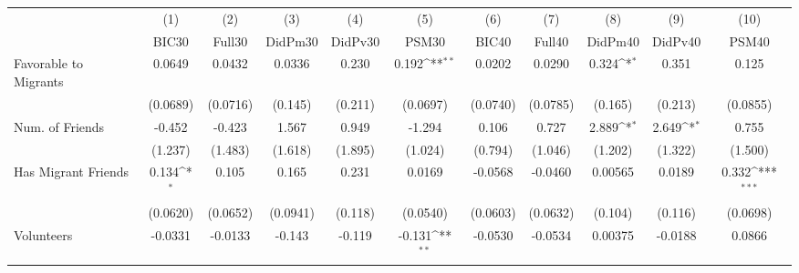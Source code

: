 {
\def\sym#1{\ifmmode^{#1}\else\(^{#1}\)\fi}
\begin{tabular}{l*{10}{c}}
\toprule
            &\multicolumn{1}{c}{(1)}&\multicolumn{1}{c}{(2)}&\multicolumn{1}{c}{(3)}&\multicolumn{1}{c}{(4)}&\multicolumn{1}{c}{(5)}&\multicolumn{1}{c}{(6)}&\multicolumn{1}{c}{(7)}&\multicolumn{1}{c}{(8)}&\multicolumn{1}{c}{(9)}&\multicolumn{1}{c}{(10)}\\
            &\multicolumn{1}{c}{BIC30}&\multicolumn{1}{c}{Full30}&\multicolumn{1}{c}{DidPm30}&\multicolumn{1}{c}{DidPv30}&\multicolumn{1}{c}{PSM30}&\multicolumn{1}{c}{BIC40}&\multicolumn{1}{c}{Full40}&\multicolumn{1}{c}{DidPm40}&\multicolumn{1}{c}{DidPv40}&\multicolumn{1}{c}{PSM40}\\
\midrule
Favorable to Migrants&      0.0649         &      0.0432         &      0.0336         &       0.230         &       0.192\sym{**} &      0.0202         &      0.0290         &       0.324\sym{*}  &       0.351         &       0.125         \\
            &    (0.0689)         &    (0.0716)         &     (0.145)         &     (0.211)         &    (0.0697)         &    (0.0740)         &    (0.0785)         &     (0.165)         &     (0.213)         &    (0.0855)         \\
\addlinespace
Num. of Friends&      -0.452         &      -0.423         &       1.567         &       0.949         &      -1.294         &       0.106         &       0.727         &       2.889\sym{*}  &       2.649\sym{*}  &       0.755         \\
            &     (1.237)         &     (1.483)         &     (1.618)         &     (1.895)         &     (1.024)         &     (0.794)         &     (1.046)         &     (1.202)         &     (1.322)         &     (1.500)         \\
\addlinespace
Has Migrant Friends&       0.134\sym{*}  &       0.105         &       0.165         &       0.231         &      0.0169         &     -0.0568         &     -0.0460         &     0.00565         &      0.0189         &       0.332\sym{***}\\
            &    (0.0620)         &    (0.0652)         &    (0.0941)         &     (0.118)         &    (0.0540)         &    (0.0603)         &    (0.0632)         &     (0.104)         &     (0.116)         &    (0.0698)         \\
\addlinespace
Volunteers  &     -0.0331         &     -0.0133         &      -0.143         &      -0.119         &      -0.131\sym{**} &     -0.0530         &     -0.0534         &     0.00375         &     -0.0188         &      0.0866         \\

\end{tabular}}
